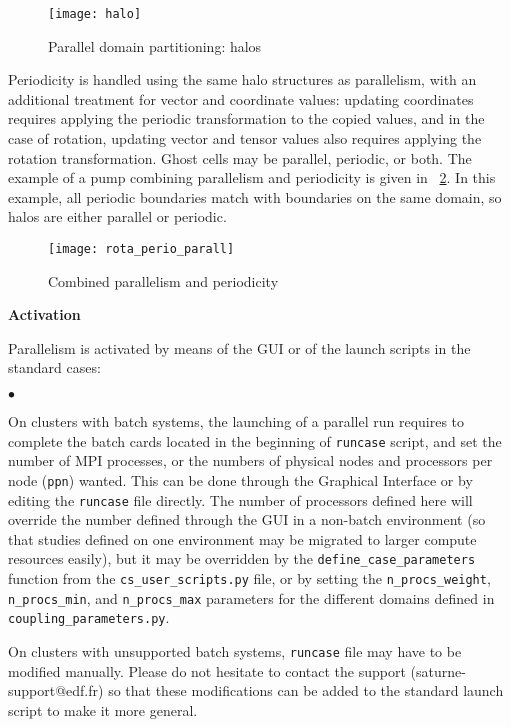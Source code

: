 {{{{\begin{figure}[!h]
\centerline{
\texttt{[image: halo]}}
\caption{Parallel domain partitioning: halos}\label{fig:haluile}
\end{figure}

Periodicity is handled using the same halo structures as parallelism,
with an additional treatment for vector and coordinate values: updating
coordinates requires applying the periodic transformation to the copied
values, and in the case of rotation, updating vector and tensor values
also requires applying the rotation transformation.
Ghost cells may be parallel, periodic, or both. The example of a pump
combining parallelism and periodicity is given in \figurename~\ref{fig:parperio_pump}.
In this example, all periodic boundaries match with boundaries on
the same domain, so halos are either parallel or periodic.

\begin{figure}[!h]
\centerline{
\texttt{[image: rota\_perio\_parall]}}
\caption{Combined parallelism and periodicity}\label{fig:parperio_pump}
\end{figure}

\label{prg_paralperio}
{\bf Activation}

Parallelism is activated by means of the GUI or of the launch scripts
in the standard cases:
\begin{list}{$\bullet$}{}

\item On clusters with batch systems, the launching of a parallel run
      requires to complete the batch cards located in the
      beginning of \texttt{runcase} script,
       and set the number of MPI processes, or the numbers
      of physical nodes and processors per node (\texttt{ppn}) wanted.
      This can be done through the Graphical Interface or by editing
      the \texttt{runcase} file directly.
      The number of processors defined here will override the number
      defined through the GUI in a non-batch environment
      (so that studies defined on one environment may be migrated
      to larger compute resources easily), but it may be overridden
      by the \texttt{define\_case\_parameters} function from
      the \texttt{cs\_user\_scripts.py} file, or by setting the
      \texttt{n\_procs\_weight}, \texttt{n\_procs\_min}, and
      \texttt{n\_procs\_max} parameters for the different domains
      defined in \texttt{coupling\_parameters.py}.

\item On clusters with unsupported batch systems,
      \texttt{runcase} file may have to be modified manually.
      Please do not hesitate to contact the \CS support
      (saturne-support@edf.fr) so that these modifications can be added to
      the standard launch script to make it more general.


\end{list}}}}}
